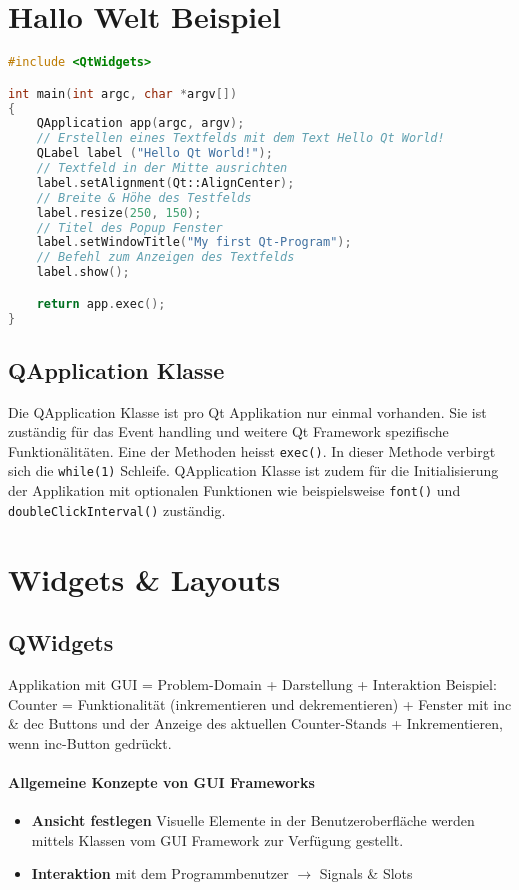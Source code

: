 \section{Hallo Welt Beispiel}

\begin{lstlisting}[language=c++]
#include <QtWidgets>

int main(int argc, char *argv[])
{
    QApplication app(argc, argv);
    // Erstellen eines Textfelds mit dem Text Hello Qt World!
    QLabel label ("Hello Qt World!");
    // Textfeld in der Mitte ausrichten
    label.setAlignment(Qt::AlignCenter);
    // Breite & Höhe des Testfelds
    label.resize(250, 150);
    // Titel des Popup Fenster
    label.setWindowTitle("My first Qt-Program");
    // Befehl zum Anzeigen des Textfelds 
    label.show();

    return app.exec();
}
\end{lstlisting}

\subsection{QApplication Klasse}
Die QApplication Klasse ist pro Qt Applikation nur einmal vorhanden. Sie ist zuständig für das Event handling und weitere Qt Framework spezifische Funktionälitäten. Eine der Methoden heisst \lstinline{exec()}. In dieser Methode verbirgt sich die \lstinline{while(1)} Schleife.
QApplication Klasse ist zudem für die Initialisierung der Applikation mit optionalen Funktionen wie beispielsweise \lstinline{font()} und \lstinline{doubleClickInterval()} zuständig.

\section{Widgets \& Layouts}

\subsection{QWidgets}
Applikation mit GUI = Problem-Domain + Darstellung + Interaktion 
Beispiel: Counter = Funktionalität (inkrementieren und dekrementieren) + Fenster mit inc \& dec Buttons und der Anzeige des aktuellen Counter-Stands + Inkrementieren, wenn inc-Button gedrückt.

\paragraph{Allgemeine Konzepte von GUI Frameworks}
\begin{itemize}
    \item \textbf{Ansicht festlegen} Visuelle Elemente in der Benutzeroberfläche werden mittels Klassen vom GUI Framework zur Verfügung gestellt. 
    \item \textbf{Interaktion} mit dem Programmbenutzer \(\rightarrow\) Signals \& Slots
\end{itemize}

